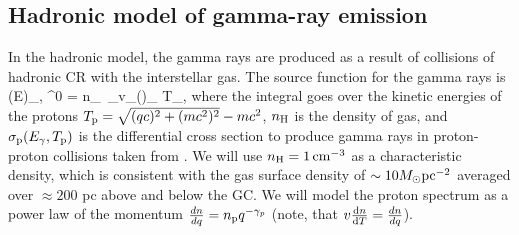 

\subsection{Hadronic model of gamma-ray emission}
\label{sec:Pion_model}

In the hadronic model, the gamma rays are produced as a result of collisions of hadronic CR with the interstellar gas.
The source function for the gamma rays is 
\be
\left(E\right)_{\!\!\gamma, \pi^0}\! = \int n_\Hy\ \sigma_\pr v_\pr \left(\right)_{\!\!\pr} \de T_\pr,
\label{eq:had_spectrum}
\ee
where the integral goes over the kinetic energies of the protons $T_{\text{p}} = \sqrt{(qc)^2 + (mc^2)^2} - mc^2$,
$n_{\text{H}}$ is the density of gas, and $\sigma_{\text{p}} (E_\gamma, T_{\text{p}})$ is 
the differential cross section to produce gamma rays in proton-proton collisions taken from \citep{2006ApJ...647..692K, 2008ApJ...674..278K}.
We will use $n_{\text{H}} = \SI{1}{cm^{-3}}$ as a characteristic density,
which is consistent with the gas surface density of $\sim 10 M_\odot {\rm pc}^{-2}$ \citep{2017ApJ...834...57M}
averaged over $\approx 200$ pc above and below the GC.
We will model the proton spectrum as a power law of the momentum $\frac{d n}{d q} = n_{\text{p}} q^{-\gamma_p}$ 
(note, that $ v \frac{\text{d} n}{\text{d} T} = \frac{d n}{d q}$).

